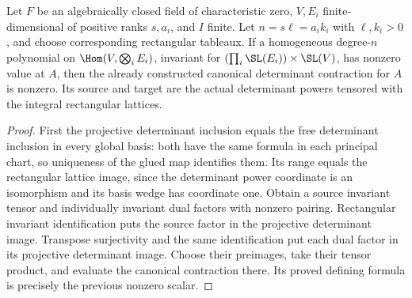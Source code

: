 \begin{lemma}
\label{lem:canonical-pairing-nonzero-algclosed}
\leanok
Let $F$ be an algebraically closed field of characteristic zero, $V,E_i$ finite-dimensional
of positive ranks $s,a_i$, and $I$ finite. Let $n=s\ell=a_i k_i$ with
$\ell,k_i>0$, and choose corresponding rectangular tableaux.
If a homogeneous degree-$n$ polynomial on $\Hom(V,\bigotimes_i E_i)$,
invariant for $(\prod_i\SL(E_i))\times\SL(V)$, has nonzero value at $A$,
then the already constructed canonical determinant contraction for $A$ is
nonzero. Its source and target are the actual determinant powers tensored
with the integral rectangular lattices.
\end{lemma}
\begin{proof}
First the projective determinant inclusion equals the free determinant
inclusion in every global basis: both have the same formula in each
principal chart, so uniqueness of the glued map identifies them.
Its range equals the rectangular lattice image, since the determinant
power coordinate is an isomorphism and its basis wedge has coordinate one.
Obtain a source invariant tensor and individually invariant dual factors
with nonzero pairing. Rectangular invariant identification puts the source
factor in the projective determinant image. Transpose surjectivity and the
same identification put each dual factor in its projective determinant
image. Choose their preimages, take their tensor product, and evaluate the
canonical contraction there. Its proved defining formula is precisely the
previous nonzero scalar.
\end{proof}

